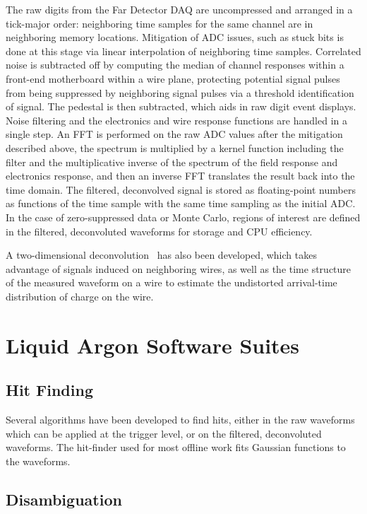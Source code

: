 The raw digits from the Far Detector DAQ are uncompressed and arranged in a tick-major order: neighboring
time samples for the same channel are in neighboring memory locations.  Mitigation of ADC issues, such as
stuck bits is done at this stage via linear interpolation of neighboring time samples.  Correlated noise
is subtracted off by computing the median of channel responses within a front-end motherboard within a wire plane,
protecting potential signal pulses from being suppressed by neighboring signal pulses via a threshold identification
of signal.  The pedestal is then subtracted, which aids in raw digit event displays.
Noise filtering and the electronics and wire response functions are handled in a single step.
An FFT is performed on the raw ADC values after the mitigation described above, the spectrum is multiplied by
a kernel function including the filter and the multiplicative inverse of the spectrum of the field response and
electronics response, and then an inverse FFT translates the result back into the time domain.  The filtered,
deconvolved signal is stored as floating-point numbers as functions of the time sample with the same time sampling
as the initial ADC.  In the case of zero-suppressed data or Monte Carlo, regions of interest are defined in the
filtered, deconvoluted waveforms for storage and CPU efficiency.

A two-dimensional deconvolution~\cite{Qian:2018qbv} has also been developed, which takes advantage of signals
induced on neighboring wires, as well as the time structure of the measured waveform on a wire to estimate the
undistorted arrival-time distribution of charge on the wire.

\section{Liquid Argon Software Suites}

\subsection{Hit Finding}

Several algorithms have been developed to find hits, either in the raw waveforms which can be applied at the
trigger level, or on the filtered, deconvoluted waveforms.  The hit-finder used for most offline work fits
Gaussian functions to the waveforms.   

\subsection{Disambiguation}

